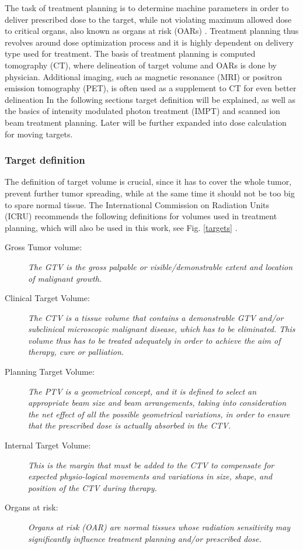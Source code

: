 \documentclass[type=dr, dr=rernat, accentcolor=tud7b,colorbacktitle, bigchapter, openright, twoside, 12pt ]{tudthesis}
\begin{document}
The task of treatment planning is to determine machine parameters in order to deliver prescribed dose to the target, while not violating maximum allowed dose to critical organs, also known as organs at risk (OARs) \cite{Richter2012}.
Treatment planning thus revolves around dose optimization process and it is highly dependent on delivery type used for treatment. The basis of treatment planning is computed tomography (CT), where delineation of target volume and OARs is
done by physician. Additional imaging, such as magnetic resonance (MRI) or positron emission tomography (PET), is often used as a supplement to CT for even better delineation In the following sections target definition will be explained,
as well as the basics of intensity modulated photon treatment (IMPT) and scanned ion beam treatment planning. Later will be further expanded into dose calculation for moving targets.

\subsubsection{Target definition}
The definition of target volume is crucial, since it has to cover the whole tumor, prevent further tumor spreading, while at the same time it should not be too big to spare normal tissue. 
The International Commission on Radiation Units (ICRU) recommends the following definitions for volumes used in treatment planning, which will also be used in this work, see Fig. \ref{targets} \cite{ICRU50, ICRU62}.

\begin{description}
\item[Gross Tumor volume:] \emph{The GTV is the gross
    palpable or visible/demonstrable extent and location of malignant
    growth.}
\item[Clinical Target Volume:] \emph{The CTV is a tissue
    volume that contains a demonstrable GTV and/or subclinical
    microscopic malignant disease, which has to be eliminated. This
    volume thus has to be treated adequately in order to achieve the
    aim of therapy, cure or palliation.}
\item[Planning Target Volume:] \emph{The PTV is a geometrical
    concept, and it is defined to select an appropriate beam size and
    beam arrangements, taking into consideration the net effect of all
    the possible geometrical variations, in order to ensure that the
    prescribed dose is actually absorbed in the CTV.}
\item[Internal Target Volume:] \emph{This is the margin that must be
    added to the CTV to compensate for expected physio-logical
    movements and variations in size, shape, and position of the
    CTV during therapy.}
\item[Organs at risk:] \emph{Organs at risk (OAR) are normal
    tissues whose radiation sensitivity may significantly influence
    treatment planning and/or prescribed dose.}
\end{description}
\end{document}
